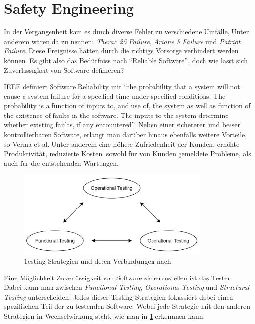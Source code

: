     \section{Safety Engineering}
        In der Vergangenheit kam es durch diverse Fehler zu verschiedene Umfälle, Unter anderem wären da zu nennen:
        \textit{Therac 25 Failure}, \textit{Ariane 5 Failure} und \textit{Patriot Failure}. Diese Ereignisse hätten
        durch die richtige Vorsorge verhindert werden können.\cite[s. 185]{Verma2015} Es gibt also das Bedürfniss
        nach ``Reliable Software'', doch wie lässt sich Zuverlässigkeit von Software definieren?

        IEEE definiert Software Reliability mit ``the probability that a system will not cause a system failure
        for a specified time under specified conditions. The probability is a function of inputs to, and use of,
        the system as well as function of the existence of faults in the software. The inputs to the system
        determine whether existing faults, if any encountered''.\cite[s. 183]{Verma2015} Neben einer sichereren und
        besser kontrollierbaren Software, erlangt man darüber hinaus ebenfalls weitere Vorteile, so Verma et al.
        Unter anderem eine höhere Zufriedenheit der Kunden, erhöhte Produktivität, reduzierte Kosten, sowohl für
        von Kunden gemeldete Probleme, als auch für die entstehenden Wartungen.

        \begin{figure}[h]
            \begin{center}
                \includegraphics[width=0.85\textwidth]{figures/testing.png}
                \caption[Testing Strategies]{Testing Strategien und deren Verbindungen nach \cite{bertolino2019}}
                \label{pic:testing-strategies}
            \end{center}
        \end{figure}

        Eine Möglichkeit Zuverlässigkeit von Software sicherzustellen ist das Testen. Dabei kann man zwischen
        \textit{Functional Testing}, \textit{Operational Testing} und \textit{Structural Testing} unterscheiden.
        Jedes dieser Testing Strategien fokussiert dabei einen spezifischen Teil der zu testenden Software. \cite[s. 26]{bertolino2019}
        Wobei jede Strategie mit den anderen Strategien in Wechselwirkung steht, wie man in \ref{pic:testing-strategies}
        erkennnen kann.

